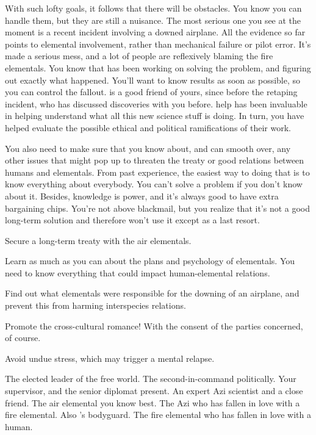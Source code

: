 \documentclass[char]{elementals}
\begin{document}
With such lofty goals, it follows that there will be obstacles.  You know you can handle them, but they are still a nuisance.  The most serious one you see at the moment is a recent incident involving a downed airplane.  All the evidence so far points to elemental involvement, rather than mechanical failure or pilot error.  It's made a serious mess, and a lot of people are reflexively blaming the fire elementals.  You know that \cScientist{\intro} has been working on solving the problem, and figuring out exactly what happened.  You'll want to know \cScientist{\their} results as soon as possible, so you can control the fallout.  \cScientist{} is a good friend of yours, since before the retaping incident, who has discussed \cScientist{\their} discoveries with you before.  \cScientist{\Their} help has been invaluable in helping understand what all this new science stuff is doing.  In turn, you have helped \cScientist{} evaluate the possible ethical and political ramifications of their work.


You also need to make sure that you know about, and can smooth over, any other issues that might pop up to threaten the treaty or good relations between humans and elementals.  From past experience, the easiest way to doing that is to know everything about everybody.  You can't solve a problem if you don't know about it.  Besides, knowledge is power, and it's always good to have extra bargaining chips.  You're not above blackmail, but you realize that it's not a good long-term solution and therefore won't use it except as a last resort.

\begin{itemz}[Goals]
	\item  Secure a long-term treaty with the air elementals.
	\item  Learn as much as you can about the plans and psychology of elementals.  You need to know everything that could impact human-elemental relations.
	\item  Find out what elementals were responsible for the downing of an airplane, and prevent this from harming interspecies relations.
	\item  Promote the cross-cultural romance!  With the consent of the parties concerned, of course.
	\item  Avoid undue stress, which may trigger a mental relapse.
\end{itemz}

\begin{contacts}
	\contact{\cLeader{}}  The elected leader of the free world.
	\contact{\cDema{}}  The second-in-command politically.
	\contact{\cAvatar{}}  Your supervisor, and the senior diplomat present.
	\contact{\cScientist{}}  An expert Azi scientist and a close friend.
	\contact{\cNaturalist{}}  The air elemental you know best. 
	\contact{\cRomeo{}}  The Azi who has fallen in love with a fire elemental.  Also \cLeader{}'s bodyguard.
	\contact{\cJuliet{}}  The fire elemental who has fallen in love with a human.
\end{contacts}
\end{document}
